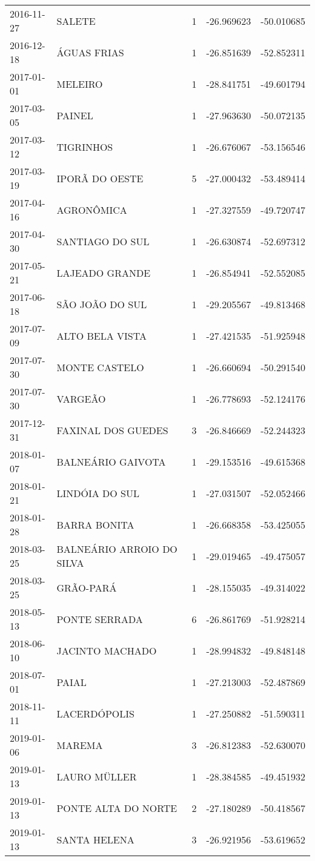 \documentclass[
	12pt,				%
	openright,			%
	oneside,			%
	a4paper,			%
	english,			%
	french,				%
	spanish,			%
	brazil				%
	dvipsnames, table]{abntex2}
\begin{document}
\begin{longtable}[htbp]{llcrr}
2016-11-27 & SALETE & 1 & -26.969623 & -50.010685 \\
2016-12-18 & ÁGUAS FRIAS & 1 & -26.851639 & -52.852311 \\
2017-01-01 & MELEIRO & 1 & -28.841751 & -49.601794 \\
2017-03-05 & PAINEL & 1 & -27.963630 & -50.072135 \\
2017-03-12 & TIGRINHOS & 1 & -26.676067 & -53.156546 \\
2017-03-19 & IPORÃ DO OESTE & 5 & -27.000432 & -53.489414 \\
2017-04-16 & AGRONÔMICA & 1 & -27.327559 & -49.720747 \\
2017-04-30 & SANTIAGO DO SUL & 1 & -26.630874 & -52.697312 \\
2017-05-21 & LAJEADO GRANDE & 1 & -26.854941 & -52.552085 \\
2017-06-18 & SÃO JOÃO DO SUL & 1 & -29.205567 & -49.813468 \\
2017-07-09 & ALTO BELA VISTA & 1 & -27.421535 & -51.925948 \\
2017-07-30 & MONTE CASTELO & 1 & -26.660694 & -50.291540 \\
2017-07-30 & VARGEÃO & 1 & -26.778693 & -52.124176 \\
2017-12-31 & FAXINAL DOS GUEDES & 3 & -26.846669 & -52.244323 \\
2018-01-07 & BALNEÁRIO GAIVOTA & 1 & -29.153516 & -49.615368 \\
2018-01-21 & LINDÓIA DO SUL & 1 & -27.031507 & -52.052466 \\
2018-01-28 & BARRA BONITA & 1 & -26.668358 & -53.425055 \\
2018-03-25 & BALNEÁRIO ARROIO DO SILVA & 1 & -29.019465 & -49.475057 \\
2018-03-25 & GRÃO-PARÁ & 1 & -28.155035 & -49.314022 \\
2018-05-13 & PONTE SERRADA & 6 & -26.861769 & -51.928214 \\
2018-06-10 & JACINTO MACHADO & 1 & -28.994832 & -49.848148 \\
2018-07-01 & PAIAL & 1 & -27.213003 & -52.487869 \\
2018-11-11 & LACERDÓPOLIS & 1 & -27.250882 & -51.590311 \\
2019-01-06 & MAREMA & 3 & -26.812383 & -52.630070 \\
2019-01-13 & LAURO MÜLLER & 1 & -28.384585 & -49.451932 \\
2019-01-13 & PONTE ALTA DO NORTE & 2 & -27.180289 & -50.418567 \\
2019-01-13 & SANTA HELENA & 3 & -26.921956 & -53.619652 \\

\end{longtable}
\end{document}
